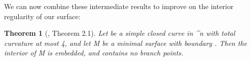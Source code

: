 \documentclass[a4paper, 11pt]{article}
\theoremstyle{plain}
\newtheorem{theorem}{Theorem}[section]
\theoremstyle{definition}
\theoremstyle{remark}
\DeclareMathOperator{\diff}{d \!}
\numberwithin{equation}{subsection}
\def\({}
\def\){}
\def\pi{}
\begin{document}
\begin{comment}
We give a proof based on the Gau\ss --Bonnet theorem. The paper also contains a second proof using integral geometry.

\begin{proof}
We first consider the case where \(\Gamma\) is smooth. Note that the cone remains closed under dilations about \(p\), so we may assume without loss of generality that \(\Gamma\) lies entirely outside the ball \(B(p,1)\). Now, let
\begin{equation}
A = \operatorname{Cone}(\Gamma, p) \setminus B(p,1)
\end{equation}
be the annular region bounded by \(\Gamma\) and \(\Pi_{p}\Gamma\). Note that \(A\) is smooth and compact, so we may apply the Gau\ss--Bonnet theorem to get:
\begin{equation}
\int_{A}K \diff\mathcal{H}^{2} + \int_{\partial A} \mathbf{k} \cdot \mathbf{n} \diff \mathcal{H}^{1} = 2\pi\chi(A),
\end{equation}
where \(K\) is the scalar curvature of \(A\), \(\mathbf{k}\) is the curvature vector of \(\partial A\), \(\mathbf{n}\) is the exterior unit normal vector of \(A\), and \(\chi(A)\) is the Euler characteristic of \(A\). Note that \(A\) is locally planar, so we have that \(K = 0\) and \(\chi(A) = 0\). Therefore,
\begin{align*}
0 &= \int_{\partial A} \mathbf{k} \cdot \mathbf{n} \diff \mathcal{H}^{1} \\
&= \int_{\Pi_{p}\Gamma} \mathbf{k} \cdot \mathbf{n} \diff \mathcal{H}^{1} + \int_{\Gamma} \mathbf{k} \cdot \mathbf{n} \diff \mathcal{H}^{1}. 
\end{align*}
The first of integrals above is equal to the length of \(\Pi_{p}\Gamma\), while the second is bounded above by the total curvature of \(\Gamma\). 

This completes the proof when \(\Gamma\) is smooth. If \(\Gamma\) is polygonal, we approximate it by smooth curves. For more general curves, we take the supremum over all inscribed polygonal curves.
\end{proof}
\end{comment}

We can now combine these intermediate results to improve on the interior regularity of our surface:

\begin{theorem}[\cite{EWW02}, Theorem 2.1]
\label{Interior_Regularity_3}
Let \(\Gamma\) be a simple closed curve in \(^{n}\) with total curvature at most \(4\pi\), and let \(M\) be a minimal surface with boundary \(\Gamma\). Then the interior of \(M\) is embedded, and contains no branch points.
\end{theorem}
\end{document}
